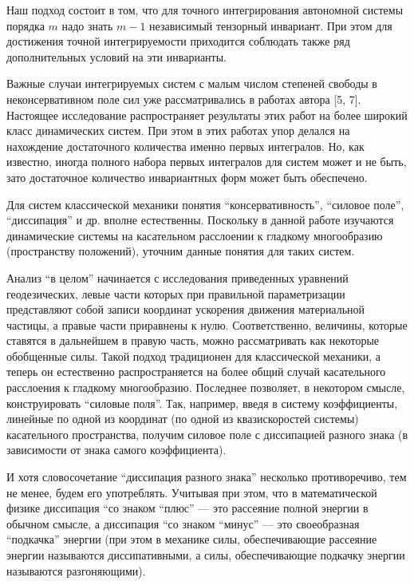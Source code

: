 Наш подход состоит в том, что для точного интегрирования автономной системы порядка $m$ надо знать $m-1$ независимый тензорный инвариант. При этом для достижения точной интегрируемости приходится соблюдать также ряд дополнительных условий на эти инварианты.

Важные случаи интегрируемых систем с малым числом степеней свободы в неконсервативном поле сил уже рассматривались в работах автора [5, 7]. Настоящее исследование распространяет результаты этих работ на более широкий класс динамических систем. При этом в этих работах упор делался на нахождение достаточного количества именно первых интегралов. Но, как известно, иногда полного набора первых интегралов для систем может и не быть, зато достаточное количество инвариантных форм может быть обеспечено. 

Для систем классической механики понятия ``консервативность'', ``силовое поле'', ``диссипация'' и др. вполне естественны. 
Поскольку в данной работе изучаются динамические системы на касательном расслоении к гладкому многообразию
(пространству положений), уточним данные понятия для таких систем. 

Анализ ``в целом'' начинается с исследования приведенных уравнений геодезических, %
левые части которых при правильной параметризации представляют собой записи координат ускорения движения материальной 
частицы, %
а правые части приравнены к нулю. Соответственно, величины, которые ставятся в дальнейшем в правую часть,
можно рассматривать как некоторые обобщенные силы. Такой подход традиционен для классической механики, а теперь он
естественно распространяется на более общий случай касательного расслоения к гладкому многообразию. Последнее позволяет, в некотором смысле,
конструировать ``силовые поля''. Так, например, введя в 
систему коэффициенты, линейные по одной из координат (по одной из квазискоростей системы) 
касательного пространства, получим силовое поле с диссипацией разного знака
(в зависимости от знака самого коэффициента).

И хотя словосочетание ``диссипация разного знака'' несколько противоречиво, тем не менее, будем его употреблять. Учитывая при этом, что в математической физике диссипация ``со знаком ``плюс'' --- это рассеяние полной энергии в обычном смысле, а диссипация ``со знаком ``минус'' --- это своеобразная ``подкачка'' энергии (при этом в механике силы, обеспечивающие рассеяние энергии называются диссипативными, а силы, обеспечивающие подкачку энергии называются разгоняющими).

